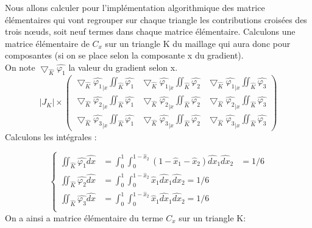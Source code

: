 \documentclass[a4paper,12pt,titlepage]{report}
\begin{document}
\begin{onehalfspace}
Nous allons calculer pour l'implémentation algorithmique des matrice élémentaires qui vont regrouper sur chaque triangle les contributions croisées des trois nœuds, soit neuf termes dans chaque matrice élémentaire.
\newline
Calculons une matrice élémentaire de $C_x$ sur un triangle K du maillage qui aura donc pour composantes (si on se place selon la composante x du gradient). \\ 
On note $\bigtriangledown_{\hat{K} }{\hat{\varphi_1}}$ la valeur du gradient selon x.
\[
|J_K| \times
\begin{pmatrix}
   	\bigtriangledown_{\hat{K} }{\hat{\varphi_1}}_{|x}\iint_{\hat{K}}  \hat{\varphi_1}&\bigtriangledown_{\hat{K}}{\hat{\varphi_1}}_{|x}\iint_{\hat{K} } \hat{\varphi_2} &\bigtriangledown_{\hat{K}}{\hat{\varphi_1}}_{|x}\iint_{\hat{K} } \hat{\varphi_3}\\ 
   	    	\bigtriangledown_{\hat{K} }{\hat{\varphi_2}}_{|x}\iint_{\hat{K}}  \hat{\varphi_1}&\bigtriangledown_{\hat{K}}{\hat{\varphi_2}}_{|x}\iint_{\hat{K} } \hat{\varphi_2} &\bigtriangledown_{\hat{K}}{\hat{\varphi_2}}_{|x}\iint_{\hat{K} } \hat{\varphi_3}\\ 
     	\bigtriangledown_{\hat{K} }{\hat{\varphi_3}}_{|x}\iint_{\hat{K}}  \hat{\varphi_1}&\bigtriangledown_{\hat{K}}{\hat{\varphi_3}}_{|x}\iint_{\hat{K} } \hat{\varphi_2} &\bigtriangledown_{\hat{K}}{\hat{\varphi_3}}_{|x}\iint_{\hat{K} } \hat{\varphi_3}
\end{pmatrix} 
\]
Calculons les intégrales :


\[	
  \left\{
    \begin{aligned}
      \iint_{\hat{K}} \hat{\varphi_1}{\hat{dx}} &= \int_{0}^{1}\int_{0}^{1-{\hat{x}}_2} (1-{{\hat{x}}_1}-{{\hat{x}}_2}) \hat{dx}_1 \hat{dx}_2 &=1/6\\
      \iint_{\hat{K} } \hat{\varphi_2}\hat{dx} &= \int_{0}^{1}\int_{0}^{1-{\hat{x}}_2} {{\hat{x}}_1} \hat{dx}_1 \hat{dx}_2 =1/6\\
       \iint_{\hat{K} } \hat{\varphi_3}\hat{dx} &= \int_{0}^{1}\int_{0}^{1-{\hat{x}}_2} {{\hat{x}}_1} \hat{dx}_1 \hat{dx}_2 =1/6\\
    \end{aligned}
  \right.
\]
\newpage
On a ainsi a matrice élémentaire du terme $C_x$ sur un triangle K:


\end{onehalfspace}
\end{document}
